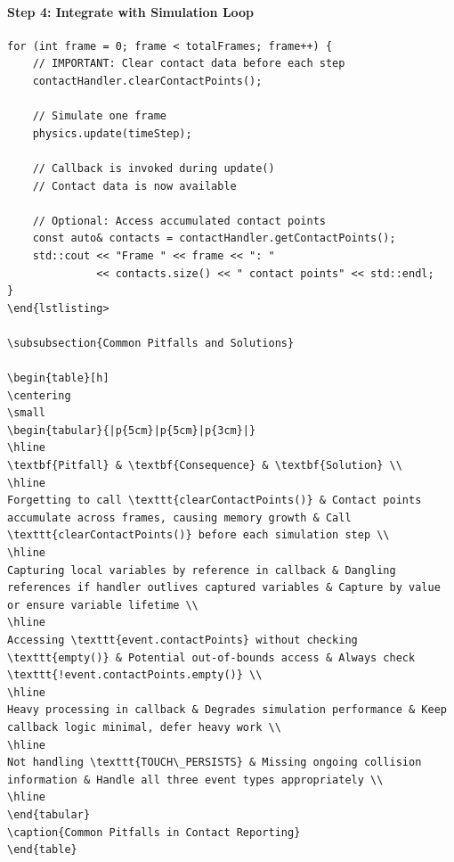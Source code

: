 \paragraph{Step 4: Integrate with Simulation Loop}

\begin{lstlisting}[style=cpp]
for (int frame = 0; frame < totalFrames; frame++) {
    // IMPORTANT: Clear contact data before each step
    contactHandler.clearContactPoints();

    // Simulate one frame
    physics.update(timeStep);

    // Callback is invoked during update()
    // Contact data is now available

    // Optional: Access accumulated contact points
    const auto& contacts = contactHandler.getContactPoints();
    std::cout << "Frame " << frame << ": "
              << contacts.size() << " contact points" << std::endl;
}
\end{lstlisting>

\subsubsection{Common Pitfalls and Solutions}

\begin{table}[h]
\centering
\small
\begin{tabular}{|p{5cm}|p{5cm}|p{3cm}|}
\hline
\textbf{Pitfall} & \textbf{Consequence} & \textbf{Solution} \\
\hline
Forgetting to call \texttt{clearContactPoints()} & Contact points accumulate across frames, causing memory growth & Call \texttt{clearContactPoints()} before each simulation step \\
\hline
Capturing local variables by reference in callback & Dangling references if handler outlives captured variables & Capture by value or ensure variable lifetime \\
\hline
Accessing \texttt{event.contactPoints} without checking \texttt{empty()} & Potential out-of-bounds access & Always check \texttt{!event.contactPoints.empty()} \\
\hline
Heavy processing in callback & Degrades simulation performance & Keep callback logic minimal, defer heavy work \\
\hline
Not handling \texttt{TOUCH\_PERSISTS} & Missing ongoing collision information & Handle all three event types appropriately \\
\hline
\end{tabular}
\caption{Common Pitfalls in Contact Reporting}
\end{table}


\end{lstlisting}

